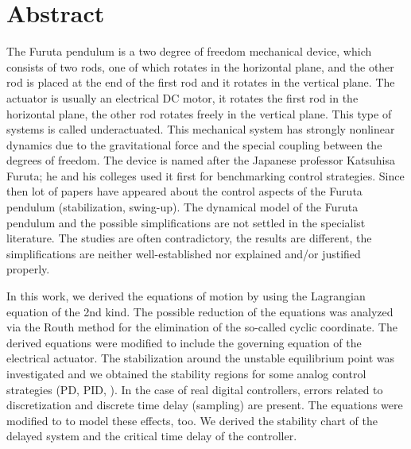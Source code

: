 
\chapter*{Abstract}							%


	
	The Furuta pendulum is a two degree of freedom mechanical device, which consists of two rods, one of which rotates in the horizontal plane, and the other rod is placed at the end of the first rod and it rotates in the vertical plane. The actuator is usually an electrical DC motor, it rotates the first rod in the horizontal plane, the other rod rotates freely in the vertical plane. This type of systems is called underactuated. This mechanical system has strongly nonlinear dynamics due to the gravitational force and the special coupling between the degrees of freedom. The device is named after the Japanese professor Katsuhisa Furuta; he and his colleges used it first for benchmarking control strategies. Since then lot of papers have appeared about the control aspects of the Furuta pendulum (stabilization, swing-up). The dynamical model of the Furuta pendulum and the possible simplifications are not settled in the specialist literature. The studies are often contradictory, the results are different, the simplifications are neither well-established nor explained and/or justified properly.

	In this work, we derived the equations of motion by using the Lagrangian equation of the 2nd kind. The possible reduction of the equations was analyzed via the Routh method for the elimination of the so-called cyclic coordinate. The derived equations were modified to include the governing equation of the electrical actuator. The stabilization around the unstable equilibrium point was investigated and we obtained the stability regions for some analog control strategies (PD, PID, \PDD{}). In the case of real digital controllers, errors related to discretization and discrete time delay (sampling) are present. The equations were modified to to model these effects, too. We derived the stability chart of the delayed system and the critical time delay of the controller.
	
	
	
